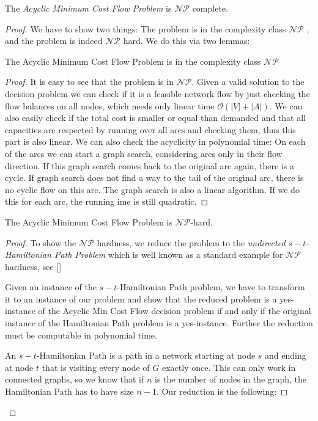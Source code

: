 \begin{theorem}
 The \textit{Acyclic Minimum Cost Flow Problem} is $\mathcal{NP}$ complete.
\end{theorem}
\begin{proof}
 We have to show two things: The problem is in the complexity class $\mathcal{NP}$ , and the problem is indeed 
$\mathcal{NP}$ hard. We do this via two lemmas:
\begin{lemma}
 The Acyclic Minimum Cost Flow Problem is in the complexity class $\mathcal{NP}$
\end{lemma}
\begin{proof}
It is easy to see that the problem is in $\mathcal{NP}$. Given a valid solution to the decision problem we can check if 
it is a feasible network flow by just checking the flow balances on all nodes, which needs only linear time 
$\mathcal{O}(|V|+|A|)$. We can also easily check if the total cost is smaller or equal than demanded and that all 
capacities are respected by running over all arcs and checking them, thus this part is also linear.
We can also check the acyclicity in polynomial time: On each of the arcs we can start a graph search, considering arcs 
only in their flow direction. If this graph search comes back to the original arc again, there is a cycle. %
If graph search does not find a way to the tail of the original arc, there is no cyclic flow on this arc. The graph 
search is also a linear algorithm. If we do this for each arc, the running ime is still quadratic.
\end{proof}

\begin{lemma}
 The Acyclic Minimum Cost Flow Problem is $\mathcal{NP}$-hard.
\end{lemma}
\begin{proof}

To show the $\mathcal{NP}$ hardness, we reduce the problem to the \textit{undirected $s-t$-Hamiltonian Path Problem} 
which is well known as a standard example for $\mathcal{NP}$ hardness, see \ref{} 

Given an instance of the $s-t$-Hamiltonian Path problem, we have to transform it to an instance of our problem and show 
that the reduced problem is a yes-instance of the Acyclic Min Cost Flow decision problem if and only if the original 
instance of the Hamiltonian Path problem is a yes-instance. Further the reduction must be computable in polynomial time.

An $s-t$-Hamiltonian Path is a path in a network starting at node $s$ and ending at node $t$ that is visiting every 
node of $G$ exactly once. This can only work in connected graphs, so we know that if $n$ is the number of nodes in the 
graph, the Hamiltonian Path has to have size $n-1$. Our reduction is the following:


\end{proof}
\end{proof}
